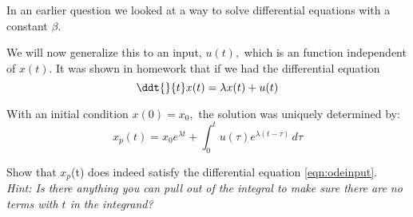 

In an earlier question we looked at a way to solve differential equations with a constant $\beta.$
\par

We will now generalize this to an input, $u(t),$ which is an function independent of $x(t)$.
It was shown in homework that if we had the differential equation
\begin{equation} \label{eqn:odeinput}
  \ddt{}{t} x(t) = \lambda x(t) + u(t)
\end{equation}

With an initial condition $x(0) = x_0,$ the solution was uniquely determined by:
\begin{equation} \label{eqn:odesol}
    x_{p}(t) = x_{0}e^{\lambda{}t} + \int_0^t \! u(\tau{})e^{\lambda{}(t - \tau{})} \, d\tau{}
\end{equation}

\begin{enumerate}

\qitem Show that $x_{p}$(t) does indeed satisfy the differential equation \eqref{eqn:odeinput}. \\
\textit{Hint: Is there anything you can pull out of the integral to make sure there are no terms with $t$ in the integrand?}



\end{enumerate}


